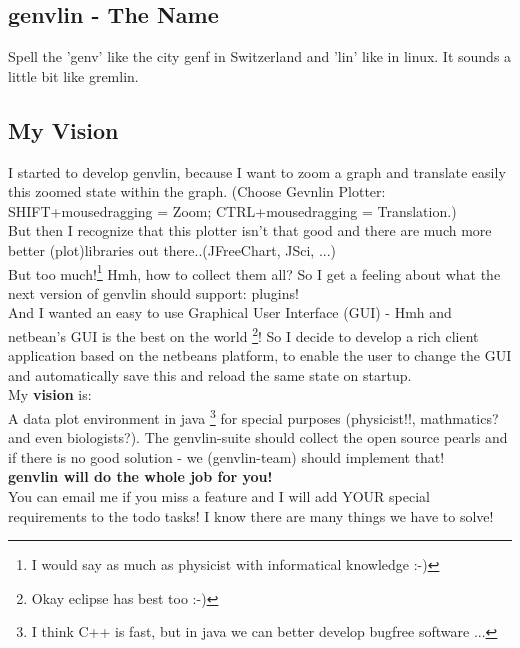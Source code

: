 \documentclass[12pt]{article}
\begin{document}
\subsection{genvlin - The Name}
Spell the 'genv' like the city genf in Switzerland and 'lin' like in linux. It sounds a little bit like gremlin.\\
\subsection{My Vision}
\label{Vision}
I started to develop genvlin, because I want to zoom a graph and translate easily this zoomed state within the graph.
(Choose Gevnlin Plotter: SHIFT+mousedragging = Zoom; CTRL+mousedragging = Translation.)\\
But then I recognize that this plotter isn't that good and there are much more better (plot)libraries out there..(JFreeChart, JSci, ...)\\
But too much!\footnote{I would say as much as physicist with informatical knowledge :-)}  Hmh, how to collect them all?
So I get a feeling about what the next version of genvlin should support: plugins!\\
And I wanted an easy to use Graphical User Interface (GUI) - Hmh and netbean's GUI is the best on the world \footnote{Okay eclipse has best too :-)}! So I decide to develop a rich client application based on the netbeans platform, to enable the user to change the GUI and automatically save this and reload the same state on startup.\\
My {\bf vision} is:\\ A data plot environment in java \footnote{I think C++ is fast, but in java we can better develop bugfree software ... } for special purposes (physicist!!, mathmatics? and even biologists?). The genvlin-suite should collect the open source pearls and if there is no good solution - we (genvlin-team) should implement that!\\[0.5cm]
{\bf \Large genvlin will do the whole job for you!}\\
You can email me if you miss a feature and I will add YOUR special requirements to the todo tasks! I know there are many things we have to solve!
\end{document}
